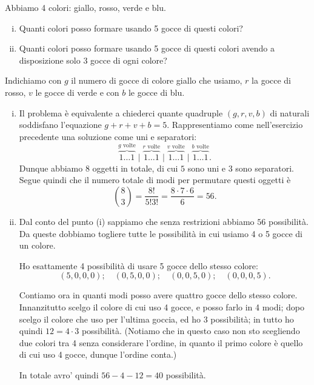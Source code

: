 \begin{example}
    Abbiamo 4 colori: giallo, rosso, verde e blu. \begin{enumerate}
        [(i)]
        \item Quanti colori posso formare usando 5 gocce di questi colori?
        \item Quanti colori posso formare usando 5 gocce di questi colori avendo a disposizione solo 3 gocce di ogni colore?
    \end{enumerate}
\end{example}
\begin{solution} Indichiamo con $g$ il numero di gocce di colore giallo che usiamo, $r$ la gocce di rosso, $v$ le gocce di verde e con $b$ le gocce di blu.
    \begin{enumerate}[(i)]
        \item Il problema è equivalente a chiederci quante quadruple $(g, r, v, b)$ di naturali soddisfano l'equazione $g + r + v + b = 5$. Rappresentiamo come nell'esercizio precedente una soluzione come uni e separatori: \[
            \overbrace{1 \dots 1}^{g \text{ volte}} \mid \overbrace{1 \dots 1}^{r \text{ volte}} \mid \overbrace{1 \dots 1}^{v \text{ volte}} \mid \overbrace{1 \dots 1}^{b \text{ volte}}.
        \] Dunque abbiamo $8$ oggetti in totale, di cui $5$ sono uni e $3$ sono separatori. Segue quindi che il numero totale di modi per permutare questi oggetti è \[
            \binom{8}{3} = \frac{8!}{5!3!} = \frac{8\cdot 7 \cdot 6}{6} = 56.
        \]
        \item Dal conto del punto (i) sappiamo che senza restrizioni abbiamo $56$ possibilità. Da queste dobbiamo togliere tutte le possibilità in cui usiamo 4 o 5 gocce di un colore.
     
        Ho esattamente 4 possibilità di usare 5 gocce dello stesso colore: \[
            (5, 0, 0, 0); \quad (0, 5, 0, 0); \quad (0, 0, 5, 0); \quad (0, 0, 0, 5).
        \] 

        Contiamo ora in quanti modi posso avere quattro gocce dello stesso colore. Innanzitutto scelgo il colore di cui uso 4 gocce, e posso farlo in 4 modi; dopo scelgo il colore che uso per l'ultima goccia, ed ho 3 possibilità; in tutto ho quindi $12 = 4 \cdot 3$ possibilità. (Notiamo che in questo caso non sto scegliendo due colori tra 4 senza considerare l'ordine, in quanto il primo colore è quello di cui uso 4 gocce, dunque l'ordine conta.)

        In totale avro' quindi $56 - 4 - 12 = 40$ possibilità.
    \end{enumerate}
\end{solution}

